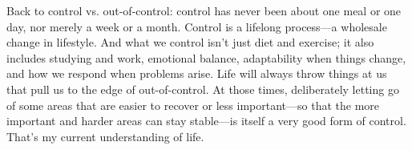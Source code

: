 Back to control vs. out-of-control: control has never been about one meal or one day, nor merely a week or a month. Control is a lifelong process—a wholesale change in lifestyle. And what we control isn’t just diet and exercise; it also includes studying and work, emotional balance, adaptability when things change, and how we respond when problems arise. Life will always throw things at us that pull us to the edge of out-of-control. At those times, deliberately letting go of some areas that are easier to recover or less important—so that the more important and harder areas can stay stable—is itself a very good form of control. That’s my current understanding of life.